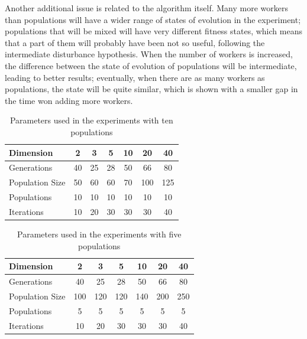 \documentclass[review]{elsarticle}
\begin{document}
Another additional issue is related to the algorithm itself. Many more
workers than populations will have a wider range of states of
evolution in the experiment; populations that will be mixed will have
very different fitness states, which means that a part of them will
probably have been not so useful, following the intermediate
disturbance hypothesis. When the number of workers is increased, the
difference between the state of evolution of populations will be
intermediate, leading to better results; eventually, when there are as
many workers as populations, the state will be quite similar, which is
shown with a smaller gap in the time won adding more workers.
%
%
\begin{table}[h!tbp]
    \small
    \caption{Parameters used in the experiments with ten populations
    }
    \label{tab:params:10}
    \vspace{0.25cm}
    \centering
    \small
    \begin{tabular}{|l|c|c|c|c|c|c|}
      \hline
      Dimension        & 2  & 3  & 5  & 10 & 20  & 40  \\ \hline
      Generations      & 40 & 25 & 28 & 50 & 66  & 80  \\ \hline
      Population Size  & 50 & 60 & 60 & 70 & 100 & 125 \\ \hline
      Populations      & 10 & 10 & 10 & 10 & 10  & 10  \\ \hline
      Iterations       & 10 & 20 & 30 & 30 & 30  & 40  \\ \hline  
    \end{tabular}
\end{table}
%
\begin{table}[h!tbp]
    \small
    \caption{Parameters used in the experiments with five populations
    }
    \label{tab:params:5}
    \vspace{0.25cm}
    \centering
    \small
    \begin{tabular}{|l|c|c|c|c|c|c|}
      \hline
      Dimension        & 2  & 3  & 5  & 10 & 20  & 40  \\ \hline
      Generations      & 40 & 25 & 28 & 50 & 66  & 80  \\ \hline
      Population Size  & 100 & 120 & 120 & 140 & 200 & 250 \\ \hline
      Populations      & 5 & 5 & 5 & 5 & 5  & 5  \\ \hline
      Iterations       & 10 & 20 & 30 & 30 & 30  & 40  \\ \hline  
    \end{tabular}
\end{table}
\end{document}

